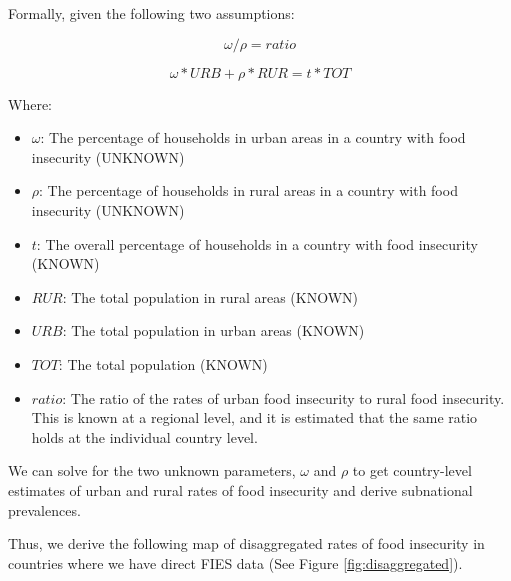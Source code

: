 \documentclass{article}
\begin{document}
Formally, given the following two assumptions:

\begin{equation} 
\omega / \rho = ratio 
\label{eq1}
\end{equation}

\begin{equation} 
\omega * URB + \rho * RUR = t * TOT
\label{eq2}
\end{equation}
\newline

Where:

\begin{itemize}
	\item $\omega$: The percentage of households in urban areas in a country with food insecurity (UNKNOWN)
	
	\item $\rho$: The percentage of households in rural areas in a country with food insecurity (UNKNOWN)
	
	\item $t$: The overall percentage of households in a country with food insecurity (KNOWN)
	
	\item $RUR$: The total population in rural areas (KNOWN)
	
	\item $URB$: The total population in urban areas (KNOWN)
	
	\item $TOT$: The total population (KNOWN)
	
	\item $ratio$: The ratio of the rates of urban food insecurity to rural food insecurity.  This is known at a regional level, and it is estimated that the same ratio holds at the individual country level.
\end{itemize}

We can solve for the two unknown parameters, $\omega$ and $\rho$ to get country-level estimates of urban and rural rates of food insecurity and derive subnational prevalences.

Thus, we derive the following map of disaggregated rates of food insecurity in countries where we have direct FIES data (See Figure \ref{fig:disaggregated}).
\end{document}
